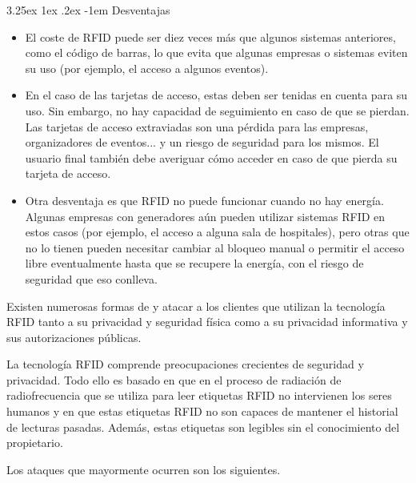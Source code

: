 \documentclass[12pt,a4paper,onecolumn,oneside]{report}
\makeatletter
\newcounter{subsubsubsection}[subsubsection]
\renewcommand\paragraph{\@startsection{paragraph}{5}{\z@}%
  {3.25ex \@plus1ex \@minus.2ex}%
  {-1em}%
  {\normalfont\normalsize\bfseries}}
\makeatother
\begin{document}
\paragraph{Desventajas}
\begin{itemize}
\item El coste de RFID puede ser diez veces más que algunos sistemas anteriores, como el código de barras, lo que evita que algunas empresas o sistemas eviten su uso (por ejemplo, el acceso a algunos eventos). 
\item En el caso de las tarjetas de acceso, estas deben ser tenidas en cuenta para su uso. Sin embargo, no hay capacidad de seguimiento en caso de que se pierdan. Las tarjetas de acceso extraviadas son una pérdida para las empresas, organizadores de eventos... y un riesgo de seguridad para los mismos. El usuario final también debe averiguar cómo acceder en caso de que pierda su tarjeta de acceso.
\item Otra desventaja es que RFID no puede funcionar cuando no hay energía. Algunas empresas con generadores aún pueden utilizar sistemas RFID en estos casos (por ejemplo, el acceso a alguna sala de hospitales), pero otras que no lo tienen pueden necesitar cambiar al bloqueo manual o permitir el acceso libre eventualmente hasta que se recupere la energía, con el riesgo de seguridad que eso conlleva.
\end{itemize}


\label{Amenazas y contramedidas en RFID}

Existen numerosas formas de y atacar a los clientes que utilizan la tecnología RFID tanto a su privacidad y seguridad física como a su privacidad informativa y sus autorizaciones públicas.

La tecnología RFID comprende preocupaciones crecientes de seguridad y privacidad. Todo ello es basado en que en el proceso de radiación de radiofrecuencia que se utiliza para leer etiquetas RFID no intervienen los seres humanos y en que estas etiquetas RFID no son capaces de mantener el historial de lecturas pasadas. Además, estas etiquetas son legibles sin el conocimiento del propietario.

Los ataques que mayormente ocurren son los siguientes.
\end{document}
